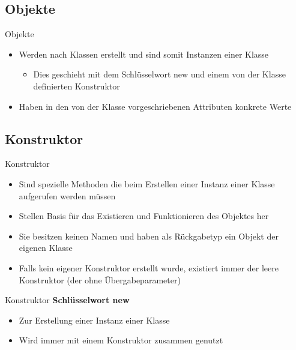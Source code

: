\subsection{Objekte}
\begin{frame}{Objekte}
	\begin{itemize}
		\item Werden nach Klassen erstellt und sind somit Instanzen einer Klasse
		\begin{itemize}
			\item Dies geschieht mit dem Schlüsselwort \alert{new} und einem von der Klasse definierten Konstruktor
		\end{itemize}
		\item Haben in den von der Klasse vorgeschriebenen Attributen konkrete Werte
	\end{itemize}
		
\end{frame}

\subsection{Konstruktor}
\begin{frame}{Konstruktor}
	\begin{itemize}
		\item Sind spezielle Methoden die beim Erstellen einer Instanz einer Klasse aufgerufen werden müssen
		\item Stellen Basis für das Existieren und Funktionieren des Objektes her 
		\item Sie besitzen keinen Namen und haben als Rückgabetyp ein Objekt der eigenen Klasse
		\item Falls kein eigener Konstruktor erstellt wurde, existiert immer der leere Konstruktor (der ohne Übergabeparameter)
	\end{itemize}
		
\end{frame}

\begin{frame}{Konstruktor}
	\textbf{Schlüsselwort new}\\
	\begin{itemize}
		\item Zur Erstellung einer Instanz einer Klasse
		\item Wird immer mit einem Konstruktor zusammen genutzt
	\end{itemize}
	
\end{frame}

